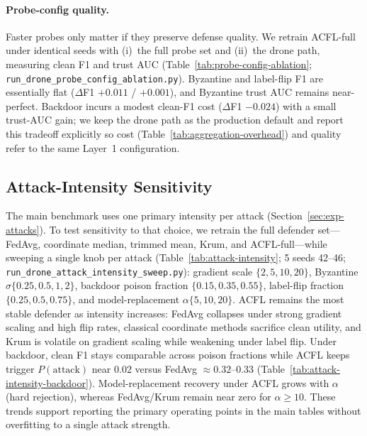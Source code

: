 \paragraph{Probe-config quality.}
\label{sec:exp-probe-config}
Faster probes only matter if they preserve defense quality.
We retrain ACFL-full under identical seeds with (i)~the full probe set and (ii)~the drone path, measuring clean F1 and trust AUC (Table~\ref{tab:probe-config-ablation}; \texttt{run\_drone\_probe\_config\_ablation.py}).
Byzantine and label-flip F1 are essentially flat ($\Delta$F1 $+0.011$ / $+0.001$), and Byzantine trust AUC remains near-perfect.
Backdoor incurs a modest clean-F1 cost ($\Delta$F1 $-0.024$) with a small trust-AUC gain; we keep the drone path as the production default and report this tradeoff explicitly so cost (Table~\ref{tab:aggregation-overhead}) and quality refer to the same Layer~1 configuration.

\subsection{Attack-Intensity Sensitivity}
\label{sec:exp-intensity}

The main benchmark uses one primary intensity per attack (Section~\ref{sec:exp-attacks}).
To test sensitivity to that choice, we retrain the full defender set---FedAvg, coordinate median, trimmed mean, Krum, and ACFL-full---while sweeping a single knob per attack (Table~\ref{tab:attack-intensity}; 5 seeds 42--46; \texttt{run\_drone\_attack\_intensity\_sweep.py}):
gradient scale $\{2,5,10,20\}$, Byzantine $\sigma\{0.25,0.5,1,2\}$, backdoor poison fraction $\{0.15,0.35,0.55\}$, label-flip fraction $\{0.25,0.5,0.75\}$, and model-replacement $\alpha\{5,10,20\}$.
ACFL remains the most stable defender as intensity increases: FedAvg collapses under strong gradient scaling and high flip rates, classical coordinate methods sacrifice clean utility, and Krum is volatile on gradient scaling while weakening under label flip.
Under backdoor, clean F1 stays comparable across poison fractions while ACFL keeps trigger $P(\text{attack})$ near $0.02$ versus FedAvg $\approx 0.32$--$0.33$ (Table~\ref{tab:attack-intensity-backdoor}).
Model-replacement recovery under ACFL grows with $\alpha$ (hard rejection), whereas FedAvg/Krum remain near zero for $\alpha{\ge}10$.
These trends support reporting the primary operating points in the main tables without overfitting to a single attack strength.

